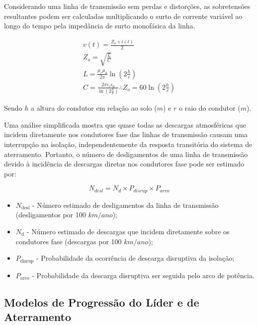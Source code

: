 \documentclass[a4paper, 12pt, onecolumn,singlespacing]{article}
\begin{document}
	Considerando uma linha de transmissão sem perdas e distorções, as sobretensões resultantes podem ser calculadas multiplicando o surto de corrente variável ao longo do tempo pela impedância de surto monofásica da linha.
	
	\begin{equation}
		\begin{split}
			v(t) = \frac{Z_o \times i(t)}{2}\\
			Z_o = \sqrt{\frac{L}{C}}\\
			L = \frac{\mu_r \mu_0}{2\pi} \ln{\left( 2\frac{h}{r}\right)}\\
			C = \frac{2 \pi \epsilon_r \epsilon_0}{\ln{\left( 2\frac{h}{r}\right)}} \therefore Z_o = 60 \ln{\left( 2\frac{h}{r}\right)}
		\end{split}
	\end{equation}
	
	Sendo $h$ a altura do condutor em relação ao solo ($m$) e $r$ o raio do condutor ($m$).
	
	Uma análise simplificada mostra que quase todas as descargas atmosféricas que incidem diretamente nos condutores fase das linhas de transmissão causam uma interrupção na isolação, independentemente da resposta transitória do sistema de aterramento. Portanto, o número de desligamentos de uma linha de transmissão devido à incidência de descargas diretas nos condutores fase pode ser estimado por:
	
	\begin{equation}
		N_{desl} = N_{d} \times P_{disrup} \times P_{arco}
	\end{equation}
	
	\begin{itemize}
		\item $N_{\text{desl}}$ - Número estimado de desligamentos da linha de transmissão (desligamentos por 100 $km/ano$);
		\item $N_{\text{d}}$ - Número estimado de descargas que incidem diretamente sobre os condutores fase (descargas por 100 $km/ano$);
		\item $P_{\text{disrup}}$ - Probabilidade da ocorrência de descarga disruptiva da isolação;
		\item $P_{\text{arco}}$ - Probabilidade da descarga disruptiva ser seguida pelo arco de potência.
	\end{itemize}
	
	\subsection{Modelos de Progressão do Líder e de Aterramento}
	
\end{document}
